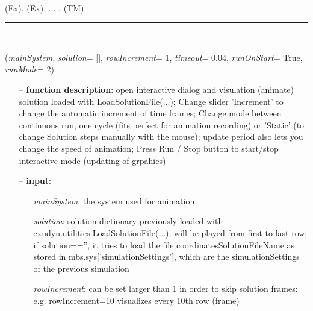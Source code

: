 \begin{itemize}[leftmargin=1.4cm]
\begin{itemize}[leftmargin=0.5cm]
\begin{itemize}[leftmargin=1.4cm]
\begin{itemize}[leftmargin=0.5cm]
\begin{itemize}[leftmargin=1.4cm]
\begin{itemize}[leftmargin=0.5cm]
\begin{itemize}[leftmargin=1.4cm]
\begin{itemize}[leftmargin=1.4cm]
\\  (Ex), 
 (Ex), 
 ...
, 
 (TM)\ei

%
\noindent\rule{8cm}{0.75pt}\vspace{1pt} \\ 
\begin{flushleft}
\label{sec:interactive:SolutionViewer}
({\it mainSystem}, {\it solution}= [], {\it rowIncrement}= 1, {\it timeout}= 0.04, {\it runOnStart}= True, {\it runMode}= 2)
\end{flushleft}
\setlength{\itemindent}{0.7cm}
\begin{itemize}[leftmargin=0.7cm]
  \item[--]  {\bf function description}: open interactive dialog and visulation (animate) solution loaded with LoadSolutionFile(...); Change slider 'Increment' to change the automatic increment of time frames; Change mode between continuous run, one cycle (fits perfect for animation recording) or 'Static' (to change Solution steps manually with the mouse); update period also lets you change the speed of animation; Press Run / Stop button to start/stop interactive mode (updating of grpahics)  \item[--]  {\bf input}: \vspace{-6pt}
  \begin{itemize}[leftmargin=1.2cm]
\setlength{\itemindent}{-0.7cm}
    \item[] {\it mainSystem}: the system used for animation
    \item[] {\it   solution}: solution dictionary previously loaded with exudyn.utilities.LoadSolutionFile(...); will be played from first to last row; if solution=='', it tries to load the file coordinatesSolutionFileName as stored in mbs.sys['simulationSettings'], which are the simulationSettings of the previous simulation
    \item[] {\it   rowIncrement}: can be set larger than 1 in order to skip solution frames: e.g. rowIncrement=10 visualizes every 10th row (frame)

\end{itemize}
\end{itemize}
\end{itemize}
\end{itemize}
\end{itemize}
\end{itemize}
\end{itemize}
\end{itemize}
\end{itemize}
\end{itemize}
